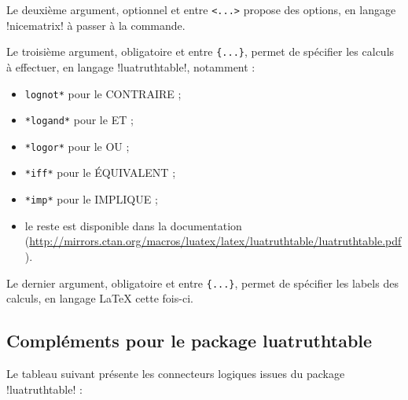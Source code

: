 \documentclass[french,a4paper,11pt]{article}
\begin{document}
{{\begin{tipblock}
Le deuxième argument, optionnel et entre \texttt{<...>} propose des options, en langage \packagetex!nicematrix! à passer à la commande.
\end{tipblock}

\pagebreak

\begin{tipblock}
Le troisième argument, obligatoire et entre \texttt{\{...\}}, permet de spécifier les calculs à effectuer, en langage \motcletex!luatruthtable!, notamment :

\begin{itemize}
	\item \texttt{lognot*} pour le \textsf{CONTRAIRE} ;
	\item \texttt{*logand*} pour le \textsf{ET} ;
	\item \texttt{*logor*} pour le \textsf{OU} ;
	\item \texttt{*iff*} pour le \textsf{ÉQUIVALENT} ;
	\item \texttt{*imp*} pour le \textsf{IMPLIQUE} ;
	\item le reste est disponible dans la documentation (\url{http://mirrors.ctan.org/macros/luatex/latex/luatruthtable/luatruthtable.pdf}).
\end{itemize}

Le dernier argument, obligatoire et entre \texttt{\{...\}}, permet de spécifier les labels des calculs, en langage \LaTeX{} cette fois-ci.
\end{tipblock}

\subsection{Compléments pour le package luatruthtable}

\begin{tipblock}
Le tableau suivant présente les connecteurs logiques issues du package \packagetex!luatruthtable! :


\end{tipblock}}}
\end{document}
